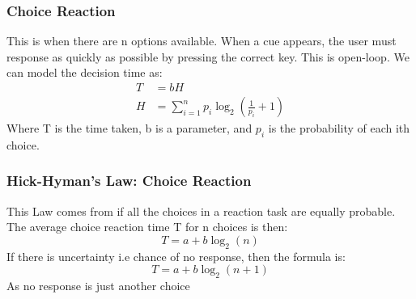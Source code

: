 \documentclass{article}
\begin{document}
\subsubsection*{Choice Reaction}
This is when there are n options available. When a cue appears, the user must response as quickly as possible by pressing the correct key. This is open-loop. We can model the decision time as:
\[
\begin{aligned}
T &= bH \\
H &= \sum_{i=1}^n p_i \log_2(\frac{1}{p_i}+1)
\end{aligned}
\]
Where T is the time taken, b is a parameter, and $p_i$ is the probability of each ith choice.
\subsubsection*{Hick-Hyman's Law: Choice Reaction}
This Law comes from if all the choices in a reaction task are equally probable. The average choice reaction time T for n choices is then:
\[
T = a + b\log_2(n)
\]
If there is uncertainty i.e chance of no response, then the formula is:
\[
T= a + b\log_2(n+1)
\]
As no response is just another choice
\end{document}
